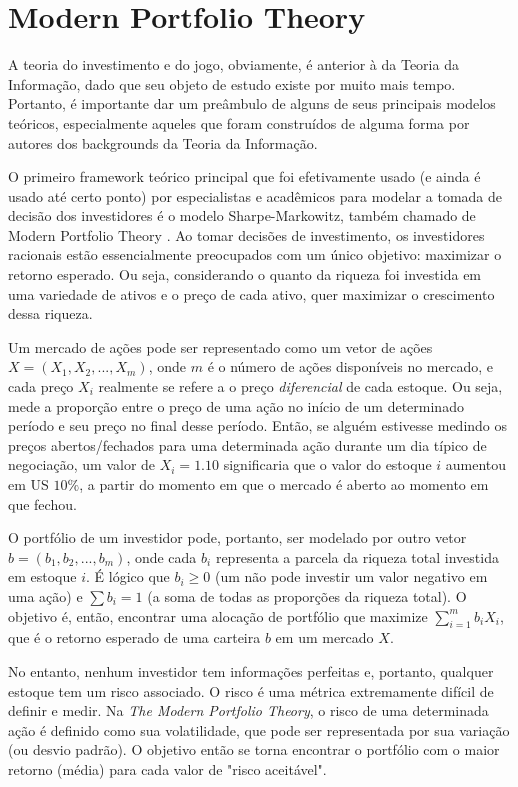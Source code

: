 \section{Modern Portfolio Theory}

A teoria do investimento e do jogo, obviamente, é anterior à da Teoria da Informação, dado que seu objeto de estudo existe por muito mais tempo. Portanto, é importante dar um preâmbulo de alguns de seus principais modelos teóricos, especialmente aqueles que foram construídos de alguma forma por autores dos backgrounds da Teoria da Informação.

O primeiro framework teórico principal que foi efetivamente usado (e ainda é usado até certo ponto) por especialistas e acadêmicos para modelar a tomada de decisão dos investidores é o modelo Sharpe-Markowitz, também chamado de Modern Portfolio Theory \cite{markowitz1}. Ao tomar decisões de investimento, os investidores racionais estão essencialmente preocupados com um único objetivo: maximizar o retorno esperado. Ou seja, considerando o quanto da riqueza foi investida em uma variedade de ativos e o preço de cada ativo, quer maximizar o crescimento dessa riqueza.

Um mercado de ações pode ser representado como um vetor de ações $ X = (X_1, X_2, ..., X_m) $, onde $ m $ é o número de ações disponíveis no mercado, e cada preço $ X_i $ realmente se refere a o preço \emph{diferencial} de cada estoque. Ou seja, mede a proporção entre o preço de uma ação no início de um determinado período e seu preço no final desse período. Então, se alguém estivesse medindo os preços abertos/fechados para uma determinada ação durante um dia típico de negociação, um valor de $ X_i = 1.10 $ significaria que o valor do estoque $ i $ aumentou em US $ 10 \% $, a partir do momento em que o mercado é aberto ao momento em que fechou.

O portfólio de um investidor pode, portanto, ser modelado por outro vetor $ b = (b_1, b_2, ..., b_m) $, onde cada $ b_i $ representa a parcela da riqueza total investida em estoque $ i $. É lógico que $ b_i \geq 0 $ (um não pode investir um valor negativo em uma ação) e $ \sum b_i = 1 $ (a soma de todas as proporções da riqueza total). O objetivo é, então, encontrar uma alocação de portfólio que maximize $ \sum_ {i = 1} ^ {m} b_iX_i $, que é o retorno esperado de uma carteira $ b $ em um mercado $ X $.

No entanto, nenhum investidor tem informações perfeitas e, portanto, qualquer estoque tem um risco associado. O risco é uma métrica extremamente difícil de definir e medir. Na \emph{The Modern Portfolio Theory}, o risco de uma determinada ação é definido como sua volatilidade, que pode ser representada por sua variação (ou desvio padrão). O objetivo então se torna encontrar o portfólio com o maior retorno (média) para cada valor de "risco aceitável".

